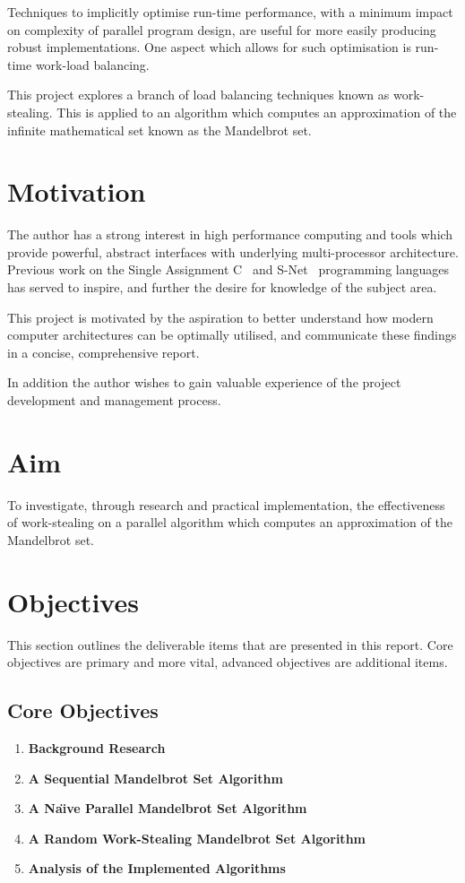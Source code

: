 Techniques to implicitly optimise run-time performance, with a minimum impact on complexity of parallel program design, 
are useful for more easily producing robust implementations. One aspect which allows for such optimisation is run-time work-load balancing.

This project explores a branch of load balancing techniques known as work-stealing. This is applied to an algorithm which
computes an approximation of the infinite mathematical set known as the Mandelbrot set.

\section*{Motivation}

The author has a strong interest in high performance computing and tools which provide powerful, abstract interfaces with 
underlying multi-processor architecture. Previous work on the Single Assignment C~\cite{sachome} and 
S-Net~\cite{snethome} programming languages has served to inspire, and further the desire for knowledge of the subject area.

This project is motivated by the aspiration to better understand how modern computer architectures can be optimally utilised,
and communicate these findings in a concise, comprehensive report.

In addition the author wishes to gain valuable experience of the project development and management process.

\section*{Aim}

To investigate, through research and practical implementation, the effectiveness of work-stealing on
a parallel algorithm which computes an approximation of the Mandelbrot set.

\section*{Objectives}
This section outlines the deliverable items that are presented in this report.
Core objectives are primary and more vital, advanced objectives are additional items.

\subsection*{Core Objectives}
\begin{enumerate}
\item \textbf{Background Research}
\item \textbf{A Sequential Mandelbrot Set Algorithm}
\item \textbf{A Na\"{\i}ve Parallel Mandelbrot Set Algorithm}
\item \textbf{A Random Work-Stealing Mandelbrot Set Algorithm}
\item \textbf{Analysis of the Implemented Algorithms}
\setcounter{saveenum}{\value{enumi}}
\end{enumerate}

